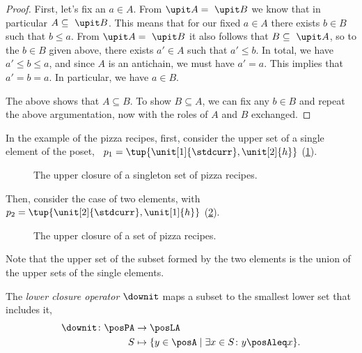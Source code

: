 \begin{proof}
  First, let's fix an $a \in A$. From $\upit  A = \ \upit  B$ we know that in particular $A \subseteq \ \upit  B$. This means that for our fixed $a \in A$ there exists $b \in B$ such that $b \leq a$. From $\upit  A = \ \upit  B$ it also follows that $B \subseteq \ \upit  A$, so to the  $b \in B$ given above, there exists $a' \in A$ such that $a' \leq b$. In total, we have $a' \leq b \leq a$, and since $A$ is an antichain, we must have $a' = a$. This implies that $a' = b = a$. In particular, we have $a \in B$.

  The above shows that $A \subseteq B$. To show $B \subseteq A$, we can fix any $b \in B$ and repeat the above argumentation, now with the roles of $A$ and $B$ exchanged.
\end{proof}

In the example of the pizza recipes, first, consider the upper set of a single element of the poset, \eg ~$p_1=\tup{\unit[1]{\stdcurr},\unit[2]{h}}$  (\cref{fig:upperclosure_1}).
\begin{figure}[h!]
  \begin{center}
  \end{center}
  \caption{The upper closure of a singleton set of pizza recipes. }
  \label{fig:upperclosure_1}
\end{figure}
Then, consider the case of two elements, with~$p_2=\tup{\unit[2]{\stdcurr},\unit[1]{h}}$ (\cref{fig:upperclosure_2}).

\begin{figure}[h!]
  \begin{center}
  \end{center}
  \caption{The upper closure of a set of pizza recipes.  }
  \label{fig:upperclosure_2}
\end{figure}
Note that the upper set of the subset formed by the two elements is the union of the upper sets of the single elements.

\begin{definition}
  The \emph{lower closure operator} $\downit$ maps a subset to the smallest lower set that includes it, \ie
  \begin{equation*}
    \begin{aligned}
      \downit \colon \posPA&\to \posLA\\
      S&\mapsto \{ y\in \posA \mid \exists x\in S \colon y\posAleq x\}.
    \end{aligned}
  \end{equation*}
\end{definition}

